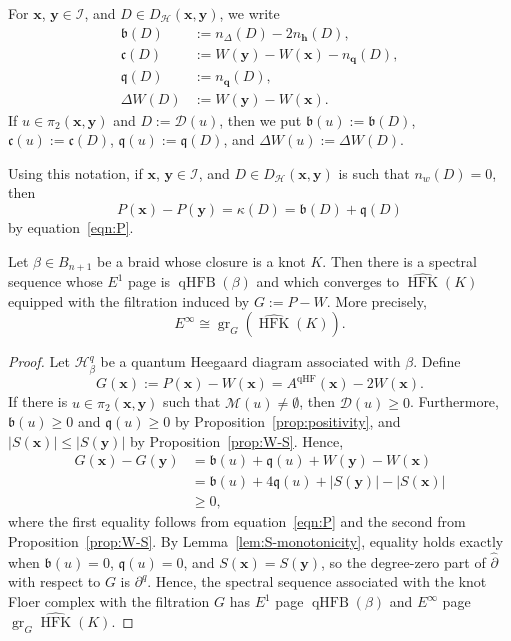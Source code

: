 \documentclass[11pt]{amsart}
\numberwithin{equation}{section}
\numberwithin{figure}{section}
\theoremstyle{definition}
\newcommand{\cD}{\mathcal{D}}
\newcommand{\cH}{\mathcal{H}}
\newcommand{\cI}{\mathcal{I}}
\newcommand{\cM}{\mathcal{M}}
\newcommand{\ph}{\widehat{\partial}}
\newcommand{\fb}{\mathfrak{b}}
\newcommand{\fc}{\mathfrak{c}}
\newcommand{\fq}{\mathfrak{q}}
\DeclareMathOperator{\gr}{gr}
\DeclareMathOperator{\qHF}{qHF}
\DeclareMathOperator{\qHFB}{qHFB}
\newcommand{\cMh}{\widehat{\cM}}
\DeclareMathOperator{\HFK}{HFK}
\newcommand{\HFKh}{\widehat{\HFK}}
\newcommand{\hs}{\boldsymbol{h}}
\newcommand{\qs}{\boldsymbol{q}}
\newcommand{\xs}{\boldsymbol{x}}
\newcommand{\ys}{\boldsymbol{y}}
\begin{document}
\begin{defn}
    For $\xs$, $\ys \in \cI$, and $D \in D_{\cH}(\xs,\ys)$, we write
    \[
    \begin{split}
    \fb(D) &:= n_\Delta(D) - 2n_{\hs}(D),\\ 
    \fc(D) &:= W(\ys) - W(\xs) - n_{\qs}(D),\\
    \fq(D) &:= n_{\qs}(D),\\
    \Delta W(D) &:= W(\ys) - W(\xs).
    \end{split}
    \]
    If $u \in \pi_2(\xs,\ys)$ and $D := \cD(u)$, then we put $\fb(u) := \fb(D)$, $\fc(u) := \fc(D)$, $\fq(u) := \fq(D)$, and $\Delta W(u) := \Delta W(D)$.
\end{defn}

Using this notation, if $\xs$, $\ys \in \cI$, and $D \in D_{\cH}(\xs,\ys)$ is such that $n_w(D) = 0$, then
\[
P(\xs) - P(\ys) = \kappa(D) = \fb(D) + \fq(D)
\]
by equation~\eqref{eqn:P}.

\begin{thm}\label{thm:spectral-sequence}
    Let $\beta \in B_{n+1}$ be a braid whose closure is a knot $K$. Then there is a spectral sequence whose $E^1$ page is $\qHFB(\beta)$ and which converges to $\HFKh(K)$ equipped with the filtration induced by $G := P - W$. More precisely, 
    \[
    E^\infty \cong \gr_G\left(\HFKh(K)\right).
    \]
\end{thm}

\begin{proof}
    Let $\cH^q_\beta$ be a quantum Heegaard diagram associated with $\beta$. Define
    \[
    G(\xs) := P(\xs) - W(\xs) = A^{\qHF}(\xs) - 2W(\xs). 
    \]
    If there is $u \in \pi_2(\xs,\ys)$ such that $\cMh(u) \neq \emptyset$, then $\cD(u) \ge 0$. Furthermore, $\fb(u) \ge 0$ and $\fq(u) \ge 0$ by Proposition~\ref{prop:positivity}, and $|S(\xs)| \le |S(\ys)|$ by Proposition~\ref{prop:W-S}. Hence,
    \[
    \begin{split}
        G(\xs) - G(\ys) &= \fb(u) + \fq(u) + W(\ys) - W(\xs) \\
        &= \fb(u) + 4\fq(u) + |S(\ys)| - |S(\xs)| \\
        &\ge 0, 
    \end{split}
    \]
    where the first equality follows from equation~\eqref{eqn:P} and the second from Proposition~\ref{prop:W-S}. By Lemma~\ref{lem:S-monotonicity}, equality holds exactly when $\fb(u) = 0$, $\fq(u) = 0$, and $S(\xs) = S(\ys)$, so the degree-zero part of $\ph$ with respect to $G$ is $\partial^q$. Hence, the spectral sequence associated with the knot Floer complex with the filtration $G$ has $E^1$ page $\qHFB(\beta)$ and $E^\infty$ page $\gr_G \HFKh(K)$.
\end{proof}
\end{document}
